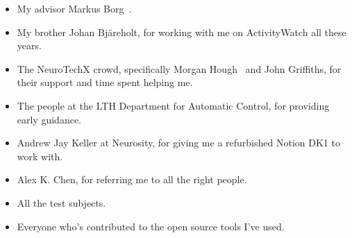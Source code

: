 \begin{itemize}
 \item My advisor Markus Borg~.
 \item My brother Johan Bjäreholt, for working with me on ActivityWatch all these years.
 \item The NeuroTechX crowd, specifically Morgan Hough~ and John Griffiths, for their support and time spent helping me.
 \item The people at the LTH Department for Automatic Control, for providing early guidance.
 \item Andrew Jay Keller at Neurosity, for giving me a refurbished Notion DK1 to work with.
 \item Alex K. Chen, for referring me to all the right people.
 \item All the test subjects.
 \item Everyone who's contributed to the open source tools I've used.
\end{itemize}
